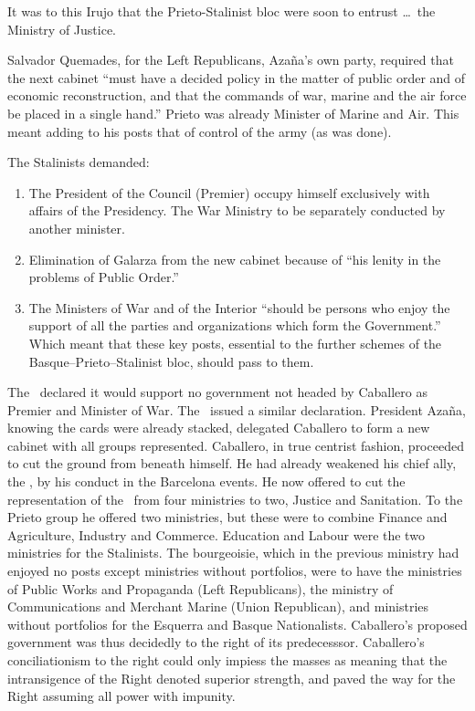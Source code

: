 It was to this Irujo that the Prieto-Stalinist bloc were soon to entrust \dots\ the Ministry of Justice.

Salvador Quemades, for the Left Republicans, Azaña’s own party, required that the next cabinet ``must have a decided policy in the matter of public order and of economic reconstruction, and that the commands of war, marine and the air force be placed in a single hand.'' Prieto was already Minister of Marine and Air. This meant adding to his posts that of control of the army (as was done).

The Stalinists demanded:

\begin{enumerate}
	\item The President of the Council (Premier) occupy himself exclusively with affairs of the Presidency. The War Ministry to be separately conducted by another minister.
	
	\item Elimination of Galarza from the new cabinet because of ``his lenity in the problems of Public Order.''
	
	\item The Ministers of War and of the Interior ``should be persons who enjoy the support of all the parties and organizations which form the Government.'' Which meant that these key posts, essential to the further schemes of the Basque--Prieto--Stalinist bloc, should pass to them.
\end{enumerate}

The \CNT\ declared it would support no government not headed by Caballero as Premier and Minister of War. The \UGT\ issued a similar declaration. President Azaña, knowing the cards were already stacked, delegated Caballero to form a new cabinet with all groups represented. Caballero, in true centrist fashion, proceeded to cut the ground from beneath himself. He had already weakened his chief ally, the \CNT, by his conduct in the Barcelona events. He now offered to cut the representation of the \CNT\ from four ministries to two, Justice and Sanitation. To the Prieto group he offered two ministries, but these were to combine Finance and Agriculture, Industry and Commerce. Education and Labour were the two ministries for the Stalinists. The bourgeoisie, which in the previous ministry had enjoyed no posts except ministries without portfolios, were to have the ministries of Public Works and Propaganda (Left Republicans), the ministry of Communications and Merchant Marine (Union Republican), and ministries without portfolios for the Esquerra and Basque Nationalists. Caballero’s proposed government was thus decidedly to the right of its predecesssor. Caballero’s conciliationism to the right could only impiess the masses as meaning that the intransigence of the Right denoted superior strength, and paved the way for the Right assuming all power with impunity.

